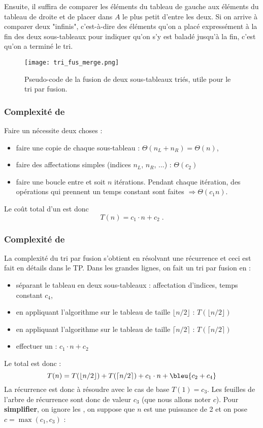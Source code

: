 \documentclass[12pt,a4paper]{book}
\begin{document}
Ensuite, il suffira de comparer les éléments du tableau de gauche aux éléments du tableau de droite et de placer dans $A$ le plus petit d'entre les deux. Si on arrive à comparer deux "infinis", c'est-à-dire des éléments qu'on a placé expressément à la fin des deux sous-tableaux pour indiquer qu'on s'y est baladé jusqu'à la fin, c'est qu'on a terminé le tri.

\begin{figure}[h]
\centering
\texttt{[image: tri\_fus\_merge.png]}
\caption{Pseudo-code de la fusion de deux sous-tableaux triés, utile pour le tri par fusion.}
\label{fig:tri_fus_merge}
\end{figure}
\subsubsection{Complexité de }
Faire un  nécessite deux choses : 
\begin{itemize}
\item faire une copie de chaque sous-tableau : $\Theta(n_L + n_R) = \Theta(n)$, 
\item faire des affectations simples (indices $n_L$, $n_R$, ...) : $\Theta(c_2)$
\item faire une boucle entre  et  soit $n$ itérations. Pendant chaque itération, des opérations qui prennent un temps constant sont faites $\Rightarrow \Theta(c_1 n)$.
\end{itemize}
Le coût total d'un  est donc $$T(n) = c_1 \cdot n + c_2 \; .$$
\subsubsection{Complexité de }
La complexité du tri par fusion s'obtient en résolvant une récurrence et ceci est fait en détails dans le TP. Dans les grandes lignes, on fait un tri par fusion en  :
\begin{itemize}
\item séparant le tableau en deux sous-tableaux : affectation d'indices, temps constant $c_4$,
\item en appliquant l'algorithme sur le tableau de taille $\lfloor n/2\rfloor$ : $T(\lfloor n/2\rfloor)$
\item en appliquant l'algorithme sur le tableau de taille $\lceil n/2\rceil$ : $T(\lceil n/2\rceil)$
\item effectuer un  : $c_1 \cdot n + c_2$
\end{itemize} 
Le total est donc :
$$T(n) = T(\lfloor n/2\rfloor) + T(\lceil n/2\rceil) + c_1 \cdot n + \bleu{c_2 + c_4}$$
La récurrence est donc à résoudre avec le cas de base $T(1) = c_3$. Les feuilles de l'arbre de récurrence sont donc de valeur $c_3$ (que nous allons noter $c$). Pour \textbf{simplifier}, on ignore les , on suppose que $n$ est une puissance de 2 et on pose $c = \max(c_1, c_3)$ :
\end{document}

